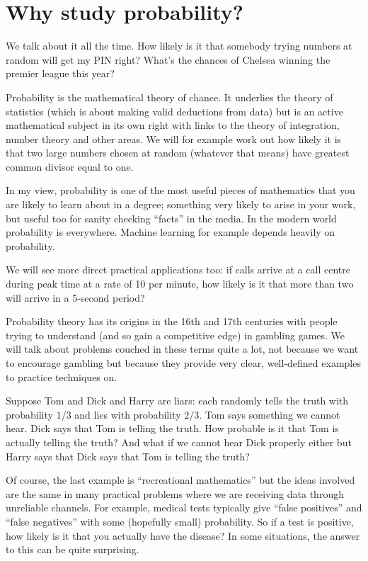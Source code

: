 \section{Why study probability?} 

We talk about it all the time. How likely is it that somebody trying numbers at random will get my PIN right?   What's the chances of Chelsea winning the premier league this year?  

Probability is the mathematical theory of chance. It underlies the theory of statistics (which is about making valid deductions from data) but is an active mathematical subject in its own right with links to the theory of integration, number theory and other areas. We will for example work out how likely it is that two large numbers chosen at random (whatever that means) have greatest common divisor equal to one. 

In my view, probability is one of the most useful pieces of mathematics that you are likely to learn about in a degree; something very likely to arise in your work, but useful too for sanity checking ``facts'' in the media.  In the modern world probability is everywhere. Machine learning for example depends heavily on probability. 

We will see more direct practical applications too: if calls arrive at a call centre during peak time at a rate of 10 per minute, how likely is it that more than two will arrive in a 5-second period?  

Probability theory has its origins in the 16th and 17th centuries with people trying to understand (and so gain a competitive edge) in gambling games. We will talk about problems couched in these terms quite a lot, not because we want to encourage gambling but because they provide very clear, well-defined examples to practice techniques on. 

 Suppose Tom and Dick and Harry are liars: each randomly tells the truth with probability $1/3$ and lies with probability $2/3$. Tom says something we cannot hear. Dick says that Tom is telling the truth.  How probable is it that Tom is actually telling the truth?   And what if we cannot hear Dick properly either but Harry says that Dick says that Tom is telling the truth?   
 
 Of course, the last example is  ``recreational mathematics'' but the ideas involved are the same in many practical problems where we are receiving data through unreliable channels. For example, medical tests typically give ``false positives'' and ``false negatives'' with some (hopefully small) probability. So if a test is positive, how likely is it that you actually have the disease?  In some situations, the answer to this can be quite surprising. 







